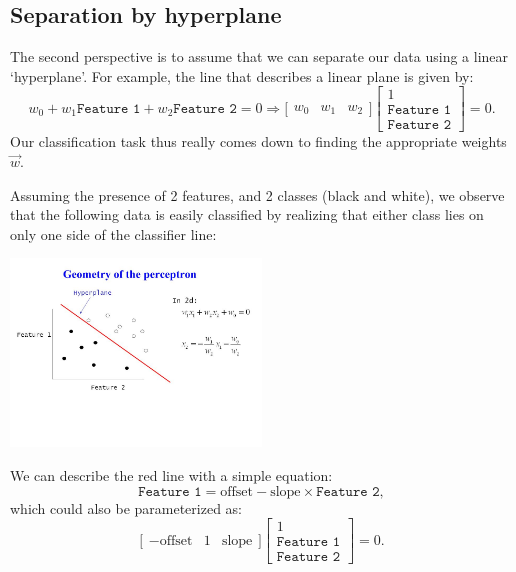 \documentclass{article}
\begin{document}
\subsection{Separation by hyperplane}
The second perspective is to assume that we can separate our data using a linear `hyperplane'. For example, the line that describes a linear plane is given by:
\begin{equation}\label{eq:linearseparator}
    w_0 + w_1\texttt{Feature 1} + w_2\texttt{Feature 2} = 0 \Longrightarrow     \Big[\begin{array}{ccc} w_0 & w_1 & w_2 \end{array} \Big] \left[ \begin{array}{c} 1 \\ \texttt{Feature 1} \\ \texttt{Feature 2} \end{array} \right] = 0.
\end{equation}
Our classification task thus really comes down to finding the appropriate weights $\vec{w}$.
\begin{testexample}[An illustration in 2-D]
    Assuming the presence of 2 features, and 2 classes (black and white), we observe that the following data is easily classified by realizing that either class lies on only one side of the classifier line:
    \begin{center}\includegraphics[width=0.5\textwidth,trim={0cm 5cm 10cm 3cm},clip]{perceptron_geometry.jpg}\end{center}
    We can describe the red line with a simple equation:
    \begin{equation}
        \texttt{Feature 1} = \text{offset} - \text{slope}\times\texttt{Feature 2},
    \end{equation}
    which could also be parameterized as:
    \begin{equation}
        \Big[\begin{array}{ccc} -\text{offset} & 1 & \text{slope} \end{array} \Big] \left[ \begin{array}{c} 1 \\ \texttt{Feature 1} \\ \texttt{Feature 2} \end{array} \right] = 0.
    \end{equation}
\end{testexample}
\end{document}

